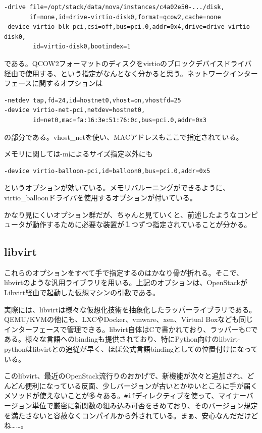 ﻿\documentclass[9pt,b5paper,tombo,openany]{jsbook}
\begin{document}
\begin{lstlisting}
-drive file=/opt/stack/data/nova/instances/c4a02e50-.../disk,
       if=none,id=drive-virtio-disk0,format=qcow2,cache=none
-device virtio-blk-pci,csi=off,bus=pci.0,addr=0x4,drive=drive-virtio-disk0,
        id=virtio-disk0,bootindex=1
\end{lstlisting}

である。QCOW2フォーマットのディスクをvirtioのブロックデバイスドライバ経由で使用する、という指定がなんとなく分かると思う。ネットワークインターフェースに関するオプションは

\begin{lstlisting}
-netdev tap,fd=24,id=hostnet0,vhost=on,vhostfd=25
-device virtio-net-pci,netdev=hostnet0,
        id=net0,mac=fa:16:3e:51:76:0c,bus=pci.0,addr=0x3
\end{lstlisting}

の部分である。vhost\_netを使い、MACアドレスもここで指定されている。

メモリに関しては-mによるサイズ指定以外にも

\begin{lstlisting}
-device virtio-balloon-pci,id=balloon0,bus=pci.0,addr=0x5
\end{lstlisting}

というオプションが効いている。メモリバルーニングができるように、virtio\_balloonドライバを使用するオプションが付いている。

かなり見にくいオプション群だが、ちゃんと見ていくと、前述したようなコンピュータが動作するために必要な装置が１つずつ指定されていることが分かる。

\subsection{libvirt}

これらのオプションをすべて手で指定するのはかなり骨が折れる。そこで、libvirtのような汎用ライブラリを用いる。上記のオプションは、OpenStackがLibvirt経由で起動した仮想マシンの引数である。

実際には、libvirtは様々な仮想化技術を抽象化したラッパーライブラリである。QEMU/KVMの他にも、LXCやDocker、vmware、xen、Virtual Boxなども同じインターフェースで管理できる。libvirt自体はCで書かれており、ラッパーもCである。様々な言語へのbindingも提供されており、特にPython向けのlibvirt-pythonはlibvirtとの追従が早く、ほぼ公式言語bindingとしての位置付けになっている。

このlibvirt、最近のOpenStack流行りのおかげで、新機能が次々と追加され、どんどん便利になっている反面、少しバージョンが古いとかゆいところに手が届くメソッドが使えないことが多々ある。\verb|#if|ディレクティブを使って、マイナーバージョン単位で厳密に新関数の組み込み可否をきめており、そのバージョン規定を満たさないと容赦なくコンパイルから外されている。まぁ、安心なんだだけどね……。
\end{document}
